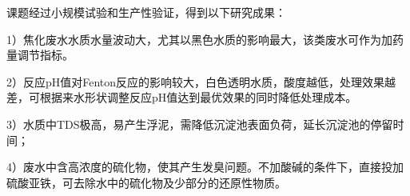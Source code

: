 课题经过小规模试验和生产性验证，得到以下研究成果：\par
1）焦化废水水质水量波动大，尤其以黑色水质的影响最大，该类废水可作为加药量调节指标。\par
2）反应pH值对Fenton反应的影响较大，白色透明水质，酸度越低，处理效果越差，可根据来水形状调整反应pH值达到最优效果的同时降低处理成本。\par
3）水质中TDS极高，易产生浮泥，需降低沉淀池表面负荷，延长沉淀池的停留时间；\par
4）废水中含高浓度的硫化物，使其产生发臭问题。不加酸碱的条件下，直接投加硫酸亚铁，可去除水中的硫化物及少部分的还原性物质。\par

